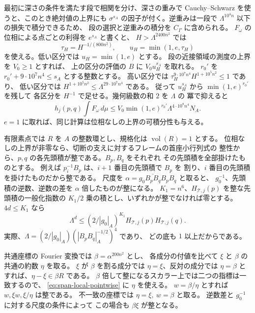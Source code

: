 最初に深さの条件を満たす段で相関を分け、深さの重みで
Cauchy--Schwarz を使うと、このとき絶対値の上界にも
\(\sigma^{s_A}\) の因子が付く。逆重みは一段で
\(\Lambda^{10^4 n}\) 以下の損失で積分できるため、
段の選択と逆重みの積分を \(C_\Gamma\) に含められる。
\(F_\omega\) の位相による点ごとの利得を \(e^{s_A}\) と書くと、
\(H>\Lambda^{2400n^2}\) では
\[
 \tau_H=H^{-1/(800n^2)},\qquad
 u_H=\min(1,e,\tau_H)
\]
を使える。低い区分では \(u_H=\min(1,e)\) とする。
段の近接領域の測度の上界を \(V_0\ge1\) とすれば、
上の区分の評価の \(B\) に \(V_0u_H^{s_A}\) を取れる。
\(r_0'\) を \(r_0'+9\cdot10^7n^4\le s_A\) とする整数とする。
高い区分では
\(\tau_H^{9\cdot10^7n^4}H^{1+10^5n^2}\le1\) であり、
低い区分では \(H^{1+10^5n^2}\le\Lambda^{29\cdot10^7n^4}\) である。
従って \(u_H^{s_A}\) から \(\min(1,e)^{r_0'}\) を残して
各区分を \(H^{-1}\) で足せる。幾何級数の和 \(2\) を \(\Lambda\) の
冪で抑えると
\begin{equation}\label{eq:span-local-shell-total}
 h_j(p,q)\int F_\omega\,d\mu
 \le V_0\min(1,e)^{r_0'}\Lambda^{4\cdot10^8n^4}N_A .
\end{equation}
\(e=1\) に取れば、同じ計算は位相なしの上界の可積分性も与える。

有限素点では \(R\) を \(A\) の整数環とし、規格化は \(\operatorname{vol}(R)=1\) とする。
位相なしの上界が非零なら、切断の支えに対するフレームの首座小行列式の
整性から、\(p,q\) の各先頭積が整である。\(B_p,B_q\) をそれぞれ
その先頭積を全部掛けたものとする。
例えば \(p_i^{-1}B_p\) は、\(i+1\) 番目の先頭積で \(B_p\) を
割り、\(i\) 番目の先頭積を掛けたものだから整である。
尺度を \(\alpha=g_0\overline{B_p B_q} B_p B_q\) と取ると、
\(g_0^{-1}\)、先頭積の逆数、逆数の差を \(\alpha\) 倍したものが整になる。
\(K_1=n^6\)、\(H_{\mathcal T,j}(p)\) を整な先頭積の一般化指数の
\(K_1/2\) 乗の積とし、いずれかが整でなければ零とする。
\(4d\le K_1\) なら
\begin{equation}\label{eq:span-local-gauge-payment}
 \Lambda^d\le(2/|g_0|_A)^{K_1}
                  H_{\mathcal T,j}(p)H_{\mathcal T,j}(q).
\end{equation}
実際、\(\Lambda=(2/|g_0|_A)(|B_p B_q|_A^{-1/2})^4\) であり、
どの底も \(1\) 以上だからである。

共通座標の Fourier 変換では \(\beta=\alpha^{200n^2}\) とし、
各成分の付値を比べて \(\xi\) と \(\beta\) の共通の約数 \(\eta\) を取る。
\(\xi\) が \(\beta\) を割る成分では \(\eta=\xi\)、反対の成分では
\(\eta=\beta\) とすれば、\(\eta-\xi\in\beta R\) である。
\(\beta\) 倍して整になるスカラー上では二つの指標は一致するので、
\eqref{eq:span-local-pointwise} に \(\eta\) を使える。
\(w=\beta/\eta\) とすれば \(w,\xi w,\xi/\eta\) は整である。
不一致の座標では \(\eta=\xi,\ w=\beta\) と取る。
逆数差と \(g_0^{-1}\) に対する尺度の条件によって
この場合も \(\beta\xi\) が整となる。

